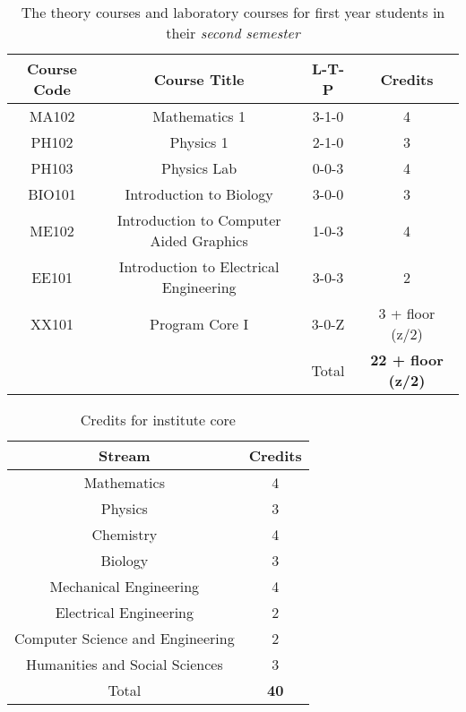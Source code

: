 \begin{table}[!htbp]
    \centering
    \begin{tabular}{c c c c}
        \toprule
        \textbf{Course Code} &  \textbf{Course Title} & \textbf{L-T-P} & \textbf{Credits} \\
        \midrule
        MA102   & Mathematics 1                             & 3-1-0 & 4 \\
        PH102   & Physics 1                                 & 2-1-0 & 3 \\
        PH103   & Physics Lab                               & 0-0-3 & 4 \\
        BIO101  & Introduction to Biology                   & 3-0-0 & 3 \\
        ME102   & Introduction to Computer Aided Graphics   & 1-0-3 & 4 \\
        EE101   & Introduction to Electrical Engineering    & 3-0-3 & 2 \\
        XX101   & Program Core I                            & 3-0-Z & 3 + floor (z/2) \\
        \midrule
        {}      & {}                                        & Total & \textbf{22 + floor (z/2)} \\
        \bottomrule
    \end{tabular}

    \caption{The theory courses and laboratory courses for first year students in their \textit{second semester}}
    \label{tab:second semester courses}
    
\end{table}

\begin{table}[h!]
    \centering
    \begin{tabular}{c c}
        \toprule
        \textbf{Stream}                     & \textbf{Credits} \\
        \midrule
        Mathematics                         & 4 \\
        Physics                             & 3 \\
        Chemistry                           & 4 \\
        Biology                             & 3 \\
        Mechanical Engineering              & 4 \\
        Electrical Engineering              & 2 \\
        Computer Science and Engineering    & 2 \\
        Humanities and Social Sciences      & 3\\
        \midrule
        Total & \textbf{40} \\
        \bottomrule
    \end{tabular}

    \caption{Credits for institute core}
    \label{tab:Credits for institute core}
    
\end{table}

